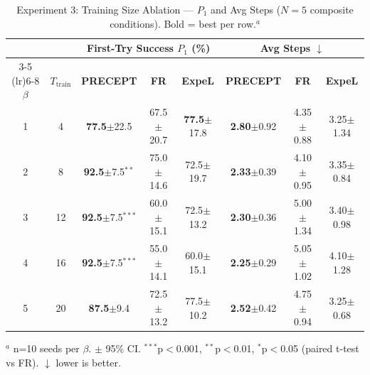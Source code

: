 \begin{table}[t]
\centering
\caption{Experiment 3: Training Size Ablation --- $P_1$ and Avg Steps ($N{=}5$ composite conditions). Bold = best per row.$^a$}
\label{tab:exp3_training_size}
\begin{tabular}{cc ccc ccc}
\toprule
& & \multicolumn{3}{c}{\textbf{First-Try Success $P_1$ (\%)}} & \multicolumn{3}{c}{\textbf{Avg Steps} $\downarrow$} \\
\cmidrule(lr){3-5} \cmidrule(lr){6-8}
$\beta$ & $T_{\text{train}}$ & \textbf{PRECEPT} & \textbf{FR} & \textbf{ExpeL} & \textbf{PRECEPT} & \textbf{FR} & \textbf{ExpeL} \\
\midrule
1 & 4 & \textbf{77.5}$\pm$22.5 & 67.5$\pm$20.7 & \textbf{77.5}$\pm$17.8 & \textbf{2.80}$\pm$0.92 & 4.35$\pm$0.88 & 3.25$\pm$1.34 \\
2 & 8 & \textbf{92.5}$\pm$7.5$^{**}$ & 75.0$\pm$14.6 & 72.5$\pm$19.7 & \textbf{2.33}$\pm$0.39 & 4.10$\pm$0.95 & 3.35$\pm$0.84 \\
3 & 12 & \textbf{92.5}$\pm$7.5$^{***}$ & 60.0$\pm$15.1 & 72.5$\pm$13.2 & \textbf{2.30}$\pm$0.36 & 5.00$\pm$1.34 & 3.40$\pm$0.98 \\
4 & 16 & \textbf{92.5}$\pm$7.5$^{***}$ & 55.0$\pm$14.1 & 60.0$\pm$15.1 & \textbf{2.25}$\pm$0.29 & 5.05$\pm$1.02 & 4.10$\pm$1.28 \\
5 & 20 & \textbf{87.5}$\pm$9.4 & 72.5$\pm$13.2 & 77.5$\pm$10.2 & \textbf{2.52}$\pm$0.42 & 4.75$\pm$0.94 & 3.25$\pm$0.68 \\
\bottomrule
\end{tabular}
\vspace{2mm}
\footnotesize
$^a$ n=10 seeds per $\beta$. $\pm$ 95\% CI. $^{***}$p$<$0.001, $^{**}$p$<$0.01, $^{*}$p$<$0.05 (paired t-test vs FR). $\downarrow$ lower is better.
\end{table}
